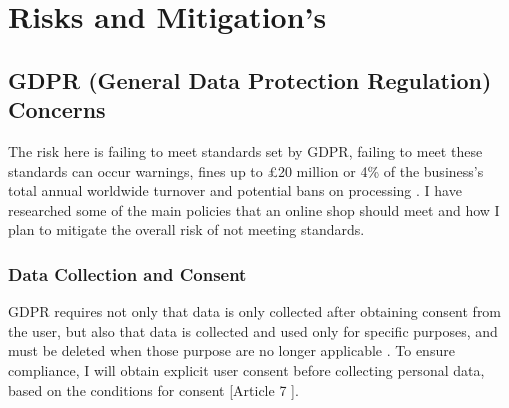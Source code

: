 \documentclass[]{project_report}
\begin{document}
\begin{center}
\end{center}



\chapter{Risks and Mitigation's}

\section{GDPR (General Data Protection Regulation) Concerns}

The risk here is failing to meet standards set by GDPR, failing to meet these standards can occur warnings, fines up to £20 million or 4\% of the business’s total annual worldwide turnover and potential bans on processing \cite{europeancommission_2023}. I have researched some of the main policies that an online shop should meet and how I plan to mitigate the overall risk of not meeting standards.

\subsection{Data Collection and Consent}

GDPR requires not only that data is only collected after obtaining consent from the user, but also that data is collected and used only for specific purposes, and must be deleted when those purpose are no longer applicable \cite{basin_2018}. To ensure compliance, I will obtain explicit user consent before collecting personal data, based on the conditions for consent \cite{gdpr_2016}[Article 7 ].
\end{document}
